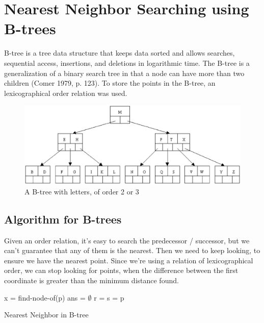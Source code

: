 \documentclass[ijoc,nonblindrev]{informs3} %
\begin{document}
\section{Nearest Neighbor Searching using B-trees}
B-tree is a tree data structure that keeps data sorted
and allows searches, sequential access, insertions,
and deletions in logarithmic time.
The B-tree is a generalization of a binary search tree
in that a node can have more than two children (Comer 1979, p. 123).
To store the points in the B-tree, an lexicographical order relation was used.

\begin{figure}[h!]
  \centering
  \includegraphics[scale=0.5]{images/b-tree}
  \caption{A B-tree with letters, of order 2 or 3}
  \label{fig:Btree}
\end{figure}

\subsection{Algorithm for B-trees}
Given an order relation, it's easy to search the predecessor / successor,
but we can't guarantee that any of them is the nearest.
Then we need to keep looking, to ensure we have the nearest point.
Since we're using a relation of lexicographical order,
we can stop looking for points, 
when the difference between the first coordinate
is greater than the minimum distance found.

\begin{algorithm}[t]
  x = find-node-of(p)\;
  ans = $\emptyset$\;
  r = s = p\;
  \caption{Nearest Neighbor in B-tree}
\end{algorithm}
\end{document}

